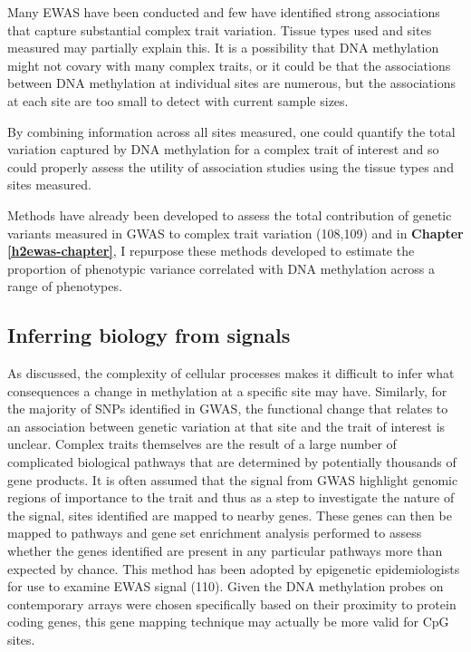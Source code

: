 \documentclass[11pt,twoside]{bristolthesis}
\begin{document}
Many EWAS have been conducted and few have identified strong associations that capture substantial complex trait variation. Tissue types used and sites measured may partially explain this. It is a possibility that DNA methylation might not covary with many complex traits, or it could be that the associations between DNA methylation at individual sites are numerous, but the associations at each site are too small to detect with current sample sizes.

By combining information across all sites measured, one could quantify the total variation captured by DNA methylation for a complex trait of interest and so could properly assess the utility of association studies using the tissue types and sites measured.

Methods have already been developed to assess the total contribution of genetic variants measured in GWAS to complex trait variation (108,109) and in \textbf{Chapter \ref{h2ewas-chapter}}, I repurpose these methods developed to estimate the proportion of phenotypic variance correlated with DNA methylation across a range of phenotypes.

\hypertarget{inferring-biology-from-signals}{%
\subsection{Inferring biology from signals}\label{inferring-biology-from-signals}}

As discussed, the complexity of cellular processes makes it difficult to infer what consequences a change in methylation at a specific site may have. Similarly, for the majority of SNPs identified in GWAS, the functional change that relates to an association between genetic variation at that site and the trait of interest is unclear. Complex traits themselves are the result of a large number of complicated biological pathways that are determined by potentially thousands of gene products. It is often assumed that the signal from GWAS highlight genomic regions of importance to the trait and thus as a step to investigate the nature of the signal, sites identified are mapped to nearby genes. These genes can then be mapped to pathways and gene set enrichment analysis performed to assess whether the genes identified are present in any particular pathways more than expected by chance. This method has been adopted by epigenetic epidemiologists for use to examine EWAS signal (110). Given the DNA methylation probes on contemporary arrays were chosen specifically based on their proximity to protein coding genes, this gene mapping technique may actually be more valid for CpG sites.
\end{document}
